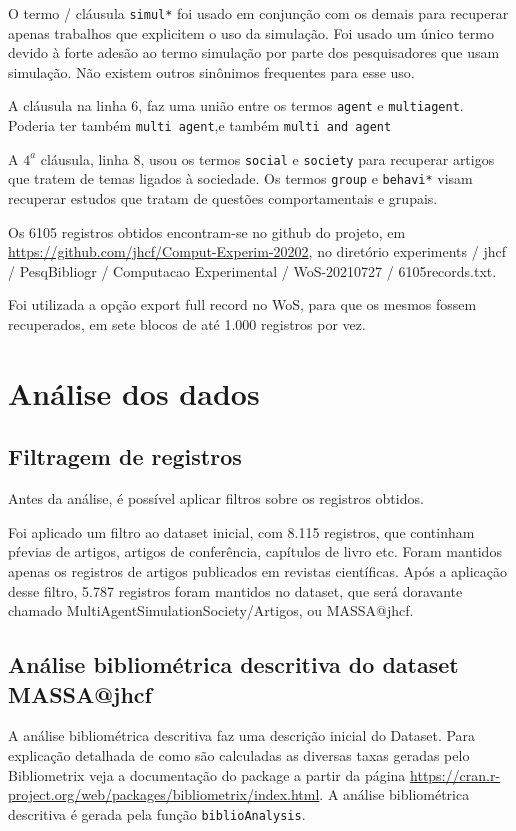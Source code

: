 O termo / cláusula  \texttt{simul*} foi usado em conjunção com os demais para recuperar apenas trabalhos que explicitem o uso da simulação.
Foi usado um único termo devido à forte adesão ao termo simulação por parte dos pesquisadores que usam simulação. Não existem outros sinônimos frequentes para esse uso.

A cláusula na linha 6, faz uma união entre os termos \texttt{agent} e \texttt{multiagent}.
Poderia ter também \texttt{multi agent},e  também \texttt{multi and agent}

A $4^{a}$ cláusula, linha 8,  usou os termos \texttt{social} e \texttt{society} para recuperar artigos que tratem de temas ligados à sociedade.
Os termos \texttt{group} e \texttt{behavi*} visam recuperar estudos que tratam de questões comportamentais e grupais.

Os 6105 registros obtidos encontram-se no github do projeto, em \url{https://github.com/jhcf/Comput-Experim-20202}, no diretório {\small experiments / jhcf / PesqBibliogr / Computacao Experimental / WoS-20210727 / 6105records.txt}. 

Foi utilizada a opção export full record no WoS, para que os mesmos fossem recuperados, em sete blocos de até 1.000 registros por vez.

\section{Análise dos dados}

\subsection{Filtragem de registros}
Antes da análise, é possível aplicar filtros sobre os registros obtidos.

Foi aplicado um filtro ao dataset inicial, com 8.115 registros, que continham pŕevias de artigos, artigos de conferência, capítulos de livro etc. Foram mantidos apenas os registros de artigos publicados em revistas científicas. Após a aplicação desse filtro, 5.787 registros foram mantidos no dataset, que será doravante chamado MultiAgentSimulationSociety/Artigos, ou MASSA@jhcf.

\subsection{Análise bibliométrica descritiva do dataset MASSA@jhcf}

A análise bibliométrica descritiva faz uma descrição inicial do Dataset. Para explicação detalhada de como são calculadas as diversas taxas geradas pelo Bibliometrix veja a documentação do package a partir da página \url{https://cran.r-project.org/web/packages/bibliometrix/index.html}. A análise bibliométrica descritiva é gerada pela função \texttt{biblioAnalysis}.

